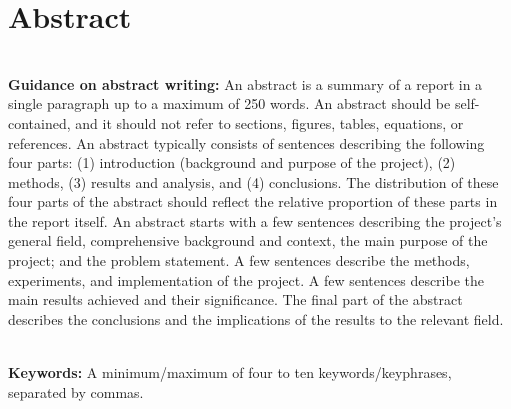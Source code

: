 
\chapter*{\center \Large  Abstract}



~\\[1cm]%
\noindent\textbf{Guidance on abstract writing:} An abstract is a summary of a report in a single paragraph up to a maximum of 250 words. An abstract should be self-contained, and it should not refer to sections, figures, tables, equations, or references. An abstract typically consists of sentences describing the following four parts: (1) introduction (background and purpose of the project), (2) methods, (3) results and analysis, and (4) conclusions. The distribution of these four parts of the abstract should reflect the relative proportion of these parts in the report itself. An abstract starts with a few sentences describing the project's general field, comprehensive background and context, the main purpose of the project; and the problem statement. A few sentences describe the methods, experiments, and implementation of the project. A few sentences describe the main results achieved and their significance. The final part of the abstract describes the conclusions and the implications of the results to the relevant field.


~\\[1cm]
\noindent %
\textbf{Keywords:} A minimum/maximum of four to ten keywords/keyphrases, separated by commas.


